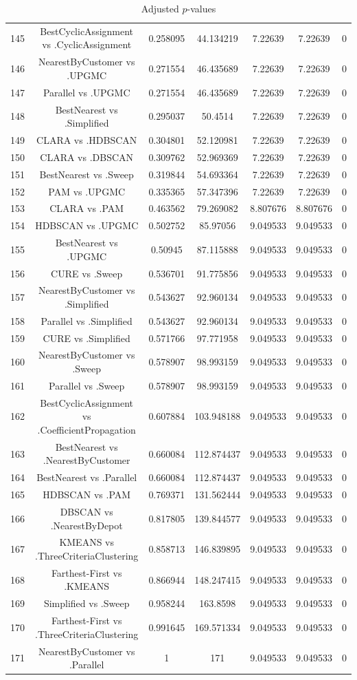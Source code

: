 \documentclass[a4paper,10pt]{article}
\begin{document}
\begin{landscape}
\begin{table}[!htp]
\begin{tabular}{ccccccc}
145&BestCyclicAssignment vs .CyclicAssignment&0.258095&44.134219&7.22639&7.22639&0\\
146&NearestByCustomer vs .UPGMC&0.271554&46.435689&7.22639&7.22639&0\\
147&Parallel vs .UPGMC&0.271554&46.435689&7.22639&7.22639&0\\
148&BestNearest vs .Simplified&0.295037&50.4514&7.22639&7.22639&0\\
149&CLARA vs .HDBSCAN&0.304801&52.120981&7.22639&7.22639&0\\
150&CLARA vs .DBSCAN&0.309762&52.969369&7.22639&7.22639&0\\
151&BestNearest vs .Sweep&0.319844&54.693364&7.22639&7.22639&0\\
152&PAM vs .UPGMC&0.335365&57.347396&7.22639&7.22639&0\\
153&CLARA vs .PAM&0.463562&79.269082&8.807676&8.807676&0\\
154&HDBSCAN vs .UPGMC&0.502752&85.97056&9.049533&9.049533&0\\
155&BestNearest vs .UPGMC&0.50945&87.115888&9.049533&9.049533&0\\
156&CURE vs .Sweep&0.536701&91.775856&9.049533&9.049533&0\\
157&NearestByCustomer vs .Simplified&0.543627&92.960134&9.049533&9.049533&0\\
158&Parallel vs .Simplified&0.543627&92.960134&9.049533&9.049533&0\\
159&CURE vs .Simplified&0.571766&97.771958&9.049533&9.049533&0\\
160&NearestByCustomer vs .Sweep&0.578907&98.993159&9.049533&9.049533&0\\
161&Parallel vs .Sweep&0.578907&98.993159&9.049533&9.049533&0\\
162&BestCyclicAssignment vs .CoefficientPropagation&0.607884&103.948188&9.049533&9.049533&0\\
163&BestNearest vs .NearestByCustomer&0.660084&112.874437&9.049533&9.049533&0\\
164&BestNearest vs .Parallel&0.660084&112.874437&9.049533&9.049533&0\\
165&HDBSCAN vs .PAM&0.769371&131.562444&9.049533&9.049533&0\\
166&DBSCAN vs .NearestByDepot&0.817805&139.844577&9.049533&9.049533&0\\
167&KMEANS vs .ThreeCriteriaClustering&0.858713&146.839895&9.049533&9.049533&0\\
168&Farthest-First vs .KMEANS&0.866944&148.247415&9.049533&9.049533&0\\
169&Simplified vs .Sweep&0.958244&163.8598&9.049533&9.049533&0\\
170&Farthest-First vs .ThreeCriteriaClustering&0.991645&169.571334&9.049533&9.049533&0\\
171&NearestByCustomer vs .Parallel&1&171&9.049533&9.049533&0\\
\hline
\end{tabular}
\caption{Adjusted $p$-values}
\end{table}

\end{landscape}
\end{document}
